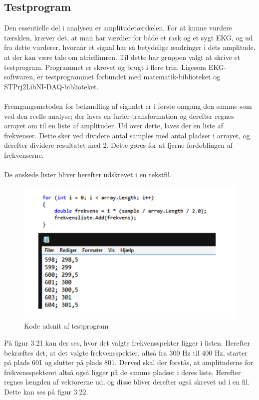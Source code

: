 \subsection{Testprogram}
Den essentielle del i analysen er amplitudetærskelen. For at kunne vurdere tærsklen, kræver det, at man har værdier for både et rask og et sygt EKG, og ud fra dette vurderer, hvornår et signal har så betydelige ændringer i dets amplitude, at der kan være tale om atrieflimren. Til dette har gruppen valgt at skrive et testprogram. Programmet er skrevet og brugt i flere trin. Ligesom EKG-softwaren, er testprogrammet forbundet med matematik-biblioteket og STPrj2LibNI-DAQ-biblioteket. \\ \\
Fremgangsmetoden for behandling af signalet er i første omgang den samme som ved den reelle analyse; der laves en furier-transformation og derefter regnes arrayet om til en liste af amplituder. Ud over dette, laves der en liste af frekvenser. Dette sker ved dividere antal samples med antal pladser i arrayet, og derefter dividere resultatet med 2. Dette gøres for at fjerne fordoblingen af frekvenserne. \\ \\
De ønskede lister bliver herefter udskrevet i en tekstfil.


\begin{figure}[H]
	\centering
	\includegraphics[width=1\textwidth]{Figurer/Snip20150520_12}
	\caption{Kode udsnit af testprogram}
\end{figure}

På figur 3.21 kan der ses, hvor det valgte frekvensspekter ligger i listen. Herefter bekræftes det, at det valgte frekvensspekter, altså fra 300 Hz til 400 Hz, starter på plads 601 og slutter på plads 801. Derved skal der forstås, at amplituderne for frekvensspekteret altså også ligger på de samme pladser i deres liste. Herefter regnes længden af vektorerne ud, og disse bliver derefter også skrevet ud i en fil. Dette kan ses på figur 3.22. 


